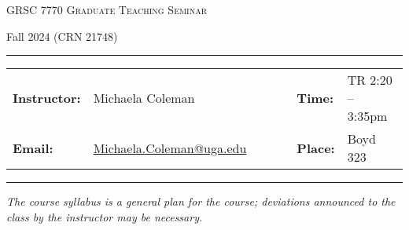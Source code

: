 \documentclass[11pt, a4paper]{article}
\begin{document}
\begin{center}
{\Large \textsc{GRSC 7770 Graduate Teaching Seminar}}
\end{center}
\begin{center}
Fall 2024 (CRN 21748)
\end{center}


\begin{center}
\rule{6in}{0.4pt}
\begin{minipage}[t]{.75\textwidth}
\begin{tabular}{llcccll}
\textbf{Instructor:} & Michaela Coleman & & &  & \textbf{Time:} & TR 2:20 -- 3:35pm \\
\textbf{Email:} &  \href{Michaela Coleman}{Michaela.Coleman@uga.edu} & & & & \textbf{Place:} & Boyd 323
\end{tabular}
\end{minipage}
\rule{6in}{0.4pt}
\end{center}
\vspace{.5cm}
\setlength{\unitlength}{1in}
\renewcommand{\arraystretch}{2}

\textit{The course syllabus is a general plan for the course; deviations
announced to the class by the instructor may be necessary.}
\end{document}
